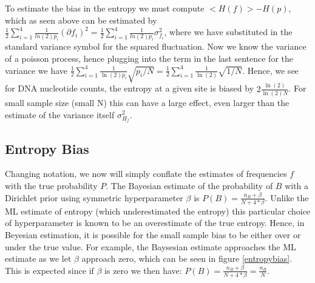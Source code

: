 To estimate the bias in the entropy we must compute $< H(f) > - H(p) $, which as seen above can be estimated by $\frac{1}{2}\sum_{i=1}^4 \frac{1}{ln(2)p_i}(\partial{f_i})^2  = \frac{1}{2}\sum_{i=1}^4 \frac{1}{ln(2)p_i}\sigma_{f_i}^2$, where we have substituted in the standard variance symbol for the squared fluctuation.  Now we know the variance of a poisson process, hence plugging into the term in the last sentence for the variance we have $\frac{1}{2}\sum_{i=1}^4 \frac{1}{\ln{(2)}p_i}\sqrt{p_i/N} =\frac{1}{2}\sum_{i=1}^4 \frac{1}{\ln{(2)}}\sqrt{1/N}$.  Hence, we see for DNA nucleotide counts, the entropy at a given site is biased by $2\frac{\ln{(2)}}{\ln{(2)}N}$.  For small sample size (small N) this can have a large effect, even larger than the estimate of the variance itself $\sigma_{H_{f}}^2$.  
\subsection{Entropy Bias}\label{entro}
Changing notation, we now will simply conflate the estimates of frequencies $f$ with the true probability $P$.  The Bayesian estimate of the probability of $B$ with a Dirichlet prior using symmetric hyperparameter $\beta$  is $P(B)=\frac{n_{B}+\beta}{N+4*\beta}$\cite{MEP}.  Unlike the ML estimate of entropy (which underestimated the entropy) this particular choice of hyperparameter is known to be an overestimate of the true entropy.  Hence, in Beyesian estimation, it is possible for the small sample bias to be either over or under the true value.  For example, the Baysesian estimate approaches the ML estimate as we let $\beta$ approach zero, which can be seen in figure \ref{entropybias}.  This is expected since if $\beta$ is zero we then have:  $P(B)=\frac{n_{B}+\beta}{N+4*\beta}=\frac{n_{B}}{N}$.

